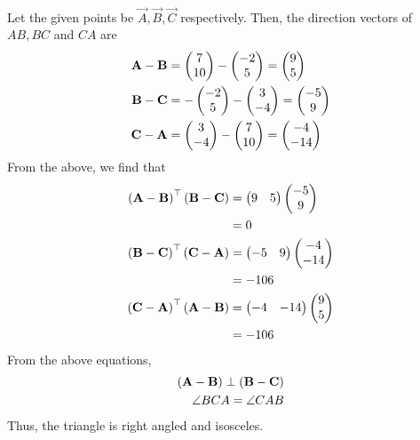 \documentclass[journal,12pt,twocolumn]{IEEEtran}
\begin{document}
\begin{enumerate}
		\\
		\solution Let the given points be $\vec{A}, \vec{B}, \vec{C}$ respectively. 
			 Then, the direction vectors of $AB, BC$ and $CA$ are
		\begin{align}
			\mathbf{A} -\mathbf{B}&= \begin{pmatrix}7 \\ 10\end{pmatrix} -\begin{pmatrix}-2 \\ 5\end{pmatrix} = \begin{pmatrix}9 \\ 5\end{pmatrix}
			\\
			\mathbf{B} -\mathbf{C}&=  -\begin{pmatrix}-2 \\ 5\end{pmatrix}-\begin{pmatrix}3 \\ -4\end{pmatrix} = \begin{pmatrix}-5 \\ 9\end{pmatrix}
			\\
			\mathbf{C} -\mathbf{A}&= \begin{pmatrix}3 \\ -4\end{pmatrix} -\begin{pmatrix}7 \\ 10\end{pmatrix} = \begin{pmatrix}-4 \\ -14\end{pmatrix}
		\end{align}
		From the above,  we find that 
		\begin{align}
			\left(\mathbf{A} -\mathbf{B}\right)^{\top}\left(\mathbf{B} -\mathbf{C}\right)&=  \begin{pmatrix}9 & 5\end{pmatrix}\begin{pmatrix}-5 \\ 9\end{pmatrix}
			\\
			&=0
			\\
			\left(\mathbf{B} -\mathbf{C}\right)^{\top}\left(\mathbf{C} -\mathbf{A}\right)&=  \begin{pmatrix}-5 & 9\end{pmatrix}\begin{pmatrix}-4 \\ -14\end{pmatrix}
\\
			&=-106
			\\
			\left(\mathbf{C} -\mathbf{A}\right)^{\top}\left(\mathbf{A} -\mathbf{B}\right)&=  \begin{pmatrix}-4 & -14\end{pmatrix}\begin{pmatrix}9 \\ 5\end{pmatrix}
\\
			&=-106
		\end{align}
		From  the above equations, 
		\begin{align}
			\left(\mathbf{A} -\mathbf{B}\right)\perp \left(\mathbf{B} -\mathbf{C}\right)
			\\
			\angle BCA = 
			\angle CAB  
		\end{align}
		Thus, the triangle is right angled and isosceles.
 \end{enumerate}
\end{document}
